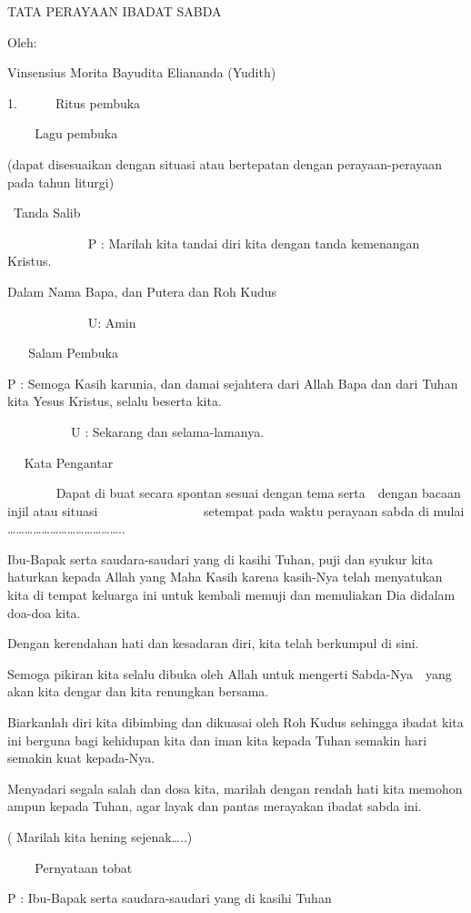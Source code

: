\documentclass{article}
\title{}
\author{}
\date{2018-02-08}
\begin{document}
TATA PERAYAAN IBADAT SABDA

Oleh:

Vinsensius Morita Bayudita Eliananda (Yudith)

1.~~~~~~Ritus pembuka

~ ~ ~Lagu pembuka

(dapat disesuaikan dengan situasi atau bertepatan dengan perayaan-perayaan pada tahun liturgi)

~Tanda Salib

~ ~ ~ ~ ~ ~ ~ ~P : Marilah kita tandai diri kita dengan tanda kemenangan Kristus.~

Dalam Nama Bapa, dan Putera dan Roh Kudus

~ ~ ~ ~ ~ ~ ~ ~U: Amin

~ ~ Salam Pembuka

P : Semoga Kasih karunia, dan damai sejahtera dari Allah Bapa dan dari Tuhan kita Yesus Kristus, selalu beserta kita.

~ ~ ~ ~ ~ ~ U : Sekarang dan selama-lamanya.

~ ~Kata Pengantar

~ ~ ~ ~ ~Dapat di buat secara spontan sesuai dengan tema serta~~dengan bacaan injil atau situasi ~ ~ ~ ~ ~ ~ ~ ~ ~
~setempat pada waktu perayaan sabda di mulai
{\dots}{\dots}{\dots}{\dots}{\dots}{\dots}{\dots}{\dots}{\dots}{\dots}{\dots}{\dots}{\dots}..

Ibu-Bapak serta saudara-saudari yang di kasihi Tuhan, puji dan syukur kita haturkan kepada Allah yang Maha Kasih karena
kasih-Nya telah menyatukan kita di tempat keluarga ini untuk kembali memuji dan memuliakan Dia didalam doa-doa kita.

Dengan kerendahan hati dan kesadaran diri, kita telah berkumpul di sini.

Semoga pikiran kita selalu dibuka oleh Allah untuk mengerti Sabda-Nya~~yang akan kita dengar dan kita renungkan bersama.

Biarkanlah diri kita dibimbing dan dikuasai oleh Roh Kudus sehingga ibadat kita ini berguna bagi kehidupan kita dan iman
kita kepada Tuhan semakin hari semakin kuat kepada-Nya.

Menyadari segala salah dan dosa kita, marilah dengan rendah hati kita memohon ampun kepada Tuhan, agar layak dan pantas
merayakan ibadat sabda ini.

( Marilah kita hening sejenak{\dots}..)

~ ~ ~Pernyataan tobat

P : Ibu-Bapak serta saudara-saudari yang di kasihi Tuhan
\end{document}
